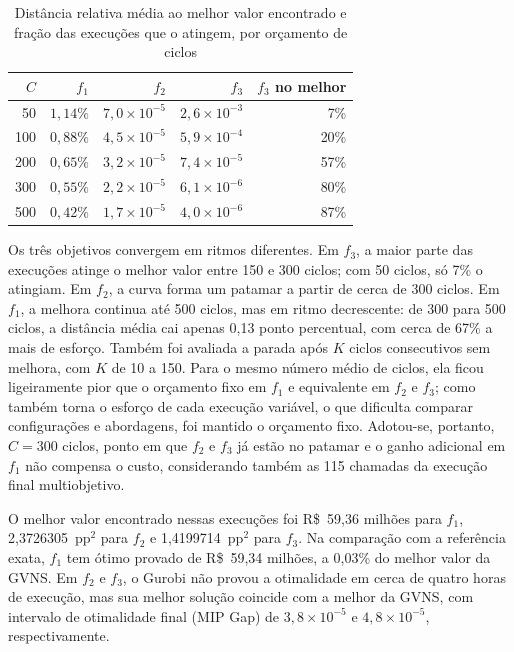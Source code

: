 \documentclass[conference]{IEEEtran}
\begin{document}
\begin{table}[htbp]
\caption{Distância relativa média ao melhor valor encontrado e fração das execuções que o atingem, por orçamento de ciclos}
\centering
\begin{tabular}{r r r r r}
\toprule
\textbf{$C$} & \textbf{$f_1$} & \textbf{$f_2$} & \textbf{$f_3$} & \textbf{$f_3$ no melhor} \\
\midrule
50 & $1{,}14\%$ & $7{,}0\times10^{-5}$ & $2{,}6\times10^{-3}$ & 7\% \\
100 & $0{,}88\%$ & $4{,}5\times10^{-5}$ & $5{,}9\times10^{-4}$ & 20\% \\
200 & $0{,}65\%$ & $3{,}2\times10^{-5}$ & $7{,}4\times10^{-5}$ & 57\% \\
300 & $0{,}55\%$ & $2{,}2\times10^{-5}$ & $6{,}1\times10^{-6}$ & 80\% \\
500 & $0{,}42\%$ & $1{,}7\times10^{-5}$ & $4{,}0\times10^{-6}$ & 87\% \\
\bottomrule
\end{tabular}
\label{tab:parada}
\end{table}

Os três objetivos convergem em ritmos diferentes. Em $f_3$, a maior parte das execuções atinge o melhor valor entre 150 e 300 ciclos; com 50 ciclos, só 7\% o atingiam. Em $f_2$, a curva forma um patamar a partir de cerca de 300 ciclos. Em $f_1$, a melhora continua até 500 ciclos, mas em ritmo decrescente: de 300 para 500 ciclos, a distância média cai apenas 0{,}13 ponto percentual, com cerca de 67\% a mais de esforço. Também foi avaliada a parada após $K$ ciclos consecutivos sem melhora, com $K$ de 10 a 150. Para o mesmo número médio de ciclos, ela ficou ligeiramente pior que o orçamento fixo em $f_1$ e equivalente em $f_2$ e $f_3$; como também torna o esforço de cada execução variável, o que dificulta comparar configurações e abordagens, foi mantido o orçamento fixo. Adotou-se, portanto, $C=300$ ciclos, ponto em que $f_2$ e $f_3$ já estão no patamar e o ganho adicional em $f_1$ não compensa o custo, considerando também as 115 chamadas da execução final multiobjetivo.

O melhor valor encontrado nessas execuções foi R\$~59{,}36 milhões para $f_1$, 2{,}3726305~pp$^2$ para $f_2$ e 1{,}4199714~pp$^2$ para $f_3$. Na comparação com a referência exata, $f_1$ tem ótimo provado de R\$~59{,}34 milhões, a 0{,}03\% do melhor valor da GVNS. Em $f_2$ e $f_3$, o Gurobi não provou a otimalidade em cerca de quatro horas de execução, mas sua melhor solução coincide com a melhor da GVNS, com intervalo de otimalidade final (MIP Gap) de $3{,}8\times10^{-5}$ e $4{,}8\times10^{-5}$, respectivamente.
\end{document}
